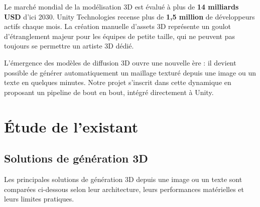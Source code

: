 \documentclass[12pt,a4paper,oneside]{report}
\begin{document}
Le marché mondial de la modélisation 3D est évalué à plus de \textbf{14
milliards USD} d'ici 2030. Unity Technologies recense plus de \textbf{1,5
million} de développeurs actifs chaque mois. La création manuelle d'assets
3D représente un goulot d'étranglement majeur pour les équipes de petite
taille, qui ne peuvent pas toujours se permettre un artiste 3D dédié.

\medskip\noindent
L'émergence des modèles de diffusion 3D ouvre une nouvelle ère : il devient
possible de générer automatiquement un maillage texturé depuis une image ou
un texte en quelques minutes. Notre projet s'inscrit dans cette dynamique en
proposant un pipeline de bout en bout, intégré directement à Unity.

\section{Étude de l'existant}

\subsection{Solutions de génération 3D}

Les principales solutions de génération 3D depuis une image ou un texte sont
comparées ci-dessous selon leur architecture, leurs performances matérielles et
leurs limites pratiques.
\end{document}
